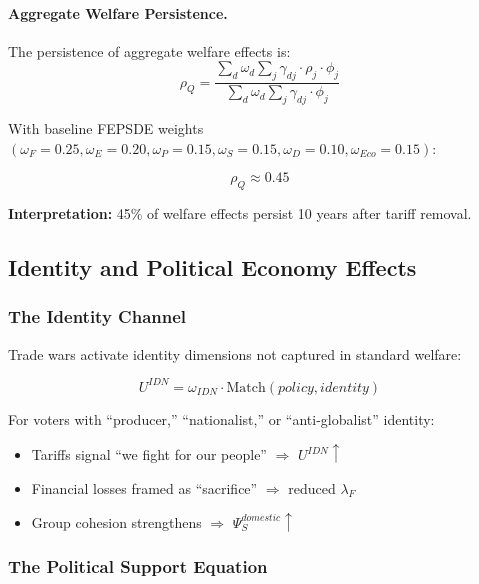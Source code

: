 \paragraph{Aggregate Welfare Persistence.}
The persistence of aggregate welfare effects is:
\begin{equation}
\rho_Q = \frac{\sum_d \omega_d \sum_j \gamma_{dj} \cdot \rho_j \cdot \phi_j}{\sum_d \omega_d \sum_j \gamma_{dj} \cdot \phi_j}
\end{equation}

With baseline FEPSDE weights $(\omega_F = 0.25, \omega_E = 0.20, \omega_P = 0.15, \omega_S = 0.15, \omega_D = 0.10, \omega_{Eco} = 0.15)$:

\begin{equation}
\rho_Q \approx 0.45
\end{equation}

\textbf{Interpretation:} 45\% of welfare effects persist 10 years after tariff removal.

\subsection{Identity and Political Economy Effects}

\subsubsection{The Identity Channel}

Trade wars activate identity dimensions not captured in standard welfare:

\begin{equation}
U^{IDN} = \omega_{IDN} \cdot \text{Match}(policy, identity)
\end{equation}

For voters with ``producer,'' ``nationalist,'' or ``anti-globalist'' identity:
\begin{itemize}
    \item Tariffs signal ``we fight for our people'' $\Rightarrow$ $U^{IDN} \uparrow$
    \item Financial losses framed as ``sacrifice'' $\Rightarrow$ reduced $\lambda_F$
    \item Group cohesion strengthens $\Rightarrow$ $\Psi_S^{domestic} \uparrow$
\end{itemize}

\subsubsection{The Political Support Equation}

